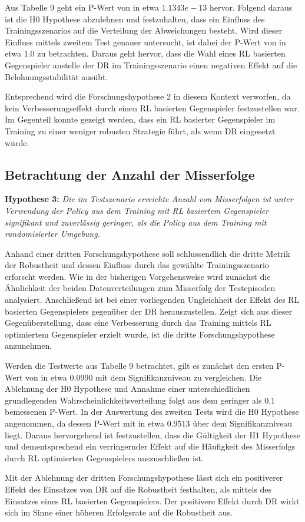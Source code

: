 Aus Tabelle 9 geht ein P-Wert von in etwa $1.1343e-13$ hervor.
Folgend daraus ist die H0 Hypothese abzulehnen und festzuhalten, dass ein Einfluss des Trainingsszenarios auf die Verteilung der Abweichungen besteht.
Wird dieser Einfluss mittels zweitem Test genauer untersucht, ist dabei der P-Wert von in etwa $1.0$ zu betrachten.
Daraus geht hervor, dass die Wahl eines RL basierten Gegenspieler anstelle der DR im Trainingsszenario einen negativen Effekt auf die Belohnungsstabilität ausübt.

Entsprechend wird die Forschungshypothese 2 in diesem Kontext verworfen, da kein Verbesserungseffekt durch einen RL basierten Gegenspieler festzustellen war.
Im Gegenteil konnte gezeigt werden, dass ein RL basierter Gegenspieler im Training zu einer weniger robusten Strategie führt, als wenn DR eingesetzt würde.

\subsection{Betrachtung der Anzahl der Misserfolge}

\textbf{Hypothese 3:}
\textit{Die im Testszenario erreichte Anzahl von Misserfolgen ist unter Verwendung der Policy aus dem Training mit RL basiertem Gegenspieler signifikant und zuverlässig geringer, als die Policy aus dem Training mit randomisierter Umgebung.}

Anhand einer dritten Forschungshypothese soll schlussendlich die dritte Metrik der Robustheit und dessen Einfluss durch das gewählte Trainingsszenario erforscht werden.
Wie in der bisherigen Vorgehensweise wird zunächst die Ähnlichkeit der beiden Datenverteilungen zum Misserfolg der Testepisoden analysiert.
Anschließend ist bei einer vorliegenden Ungleichheit der Effekt des RL basierten Gegenspielers gegenüber der DR herauszustellen.
Zeigt sich aus dieser Gegenüberstellung, dass eine Verbesserung durch das Training mittels RL optimiertem Gegenspieler erzielt wurde, ist die dritte Forschungshypothese anzunehmen. 

Werden die Testwerte aus Tabelle 9 betrachtet, gilt es zunächst den ersten P-Wert von in etwa $0.0990$ mit dem Signifikanzniveau zu vergleichen.
Die Ablehnung der H0 Hypothese und Annahme einer unterschiedlichen grundlegenden Wahrscheinlichkeitsverteilung folgt aus dem geringer als $0.1$ bemessenen P-Wert.
In der Auswertung des zweiten Tests wird die H0 Hypothese angenommen, da dessen P-Wert mit in etwa $0.9513$ über dem Signifikanzniveau liegt.
Daraus hervorgehend ist festzustellen, dass die Gültigkeit der H1 Hypothese und dementsprechend ein verringernder Effekt auf die Häufigkeit des Misserfolgs durch RL optimierten Gegenspielers auszuschließen ist.

Mit der Ablehnung der dritten Forschungshypothese lässt sich ein positiverer Effekt des Einsatzes von DR auf die Robustheit festhalten, als mittels des Einsatzes eines RL basierten Gegenspielers.
Der positivere Effekt durch DR wirkt sich im Sinne einer höheren Erfolgsrate auf die Robustheit aus.